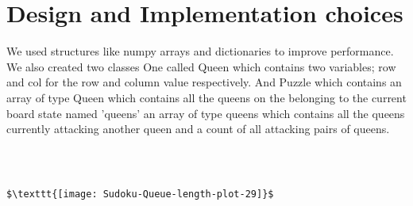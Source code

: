 \documentclass{article}
\begin{document}
\section{Design and Implementation choices}
 We used structures like numpy arrays and dictionaries to improve performance. We also created two classes One called Queen which contains two variables; row and col for the row and column value respectively. And Puzzle which contains an array of type Queen which contains all the queens on the belonging to the current board state named 'queens' an array of type queens which contains all the queens currently attacking another queen and a count of all attacking pairs of queens.   


\begin{verbatim}



$\texttt{[image: Sudoku-Queue-length-plot-29]}$


\end{verbatim}
\end{document}
